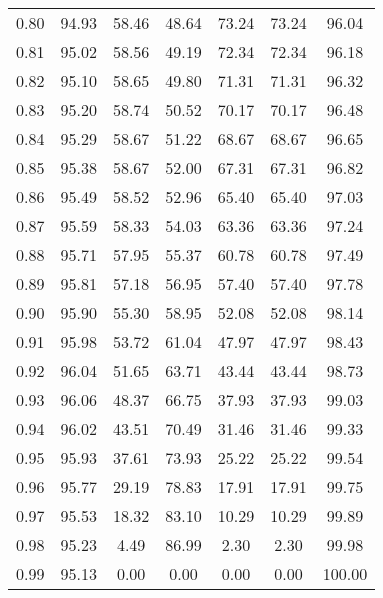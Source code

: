\begin{tabular}{|c|c|c|c|c|c|c|}
      0.80 &     94.93 &     58.46 &      48.64 &   73.24 &      73.24 &         96.04 \\
      0.81 &     95.02 &     58.56 &      49.19 &   72.34 &      72.34 &         96.18 \\
      0.82 &     95.10 &     58.65 &      49.80 &   71.31 &      71.31 &         96.32 \\
      0.83 &     95.20 &     58.74 &      50.52 &   70.17 &      70.17 &         96.48 \\
      0.84 &     95.29 &     58.67 &      51.22 &   68.67 &      68.67 &         96.65 \\
      0.85 &     95.38 &     58.67 &      52.00 &   67.31 &      67.31 &         96.82 \\
      0.86 &     95.49 &     58.52 &      52.96 &   65.40 &      65.40 &         97.03 \\
      0.87 &     95.59 &     58.33 &      54.03 &   63.36 &      63.36 &         97.24 \\
      0.88 &     95.71 &     57.95 &      55.37 &   60.78 &      60.78 &         97.49 \\
      0.89 &     95.81 &     57.18 &      56.95 &   57.40 &      57.40 &         97.78 \\
      0.90 &     95.90 &     55.30 &      58.95 &   52.08 &      52.08 &         98.14 \\
      0.91 &     95.98 &     53.72 &      61.04 &   47.97 &      47.97 &         98.43 \\
      0.92 &     96.04 &     51.65 &      63.71 &   43.44 &      43.44 &         98.73 \\
      0.93 &     96.06 &     48.37 &      66.75 &   37.93 &      37.93 &         99.03 \\
      0.94 &     96.02 &     43.51 &      70.49 &   31.46 &      31.46 &         99.33 \\
      0.95 &     95.93 &     37.61 &      73.93 &   25.22 &      25.22 &         99.54 \\
      0.96 &     95.77 &     29.19 &      78.83 &   17.91 &      17.91 &         99.75 \\
      0.97 &     95.53 &     18.32 &      83.10 &   10.29 &      10.29 &         99.89 \\
      0.98 &     95.23 &      4.49 &      86.99 &    2.30 &       2.30 &         99.98 \\
      0.99 &     95.13 &      0.00 &       0.00 &    0.00 &       0.00 &        100.00 \\
\bottomrule
\end{tabular}
